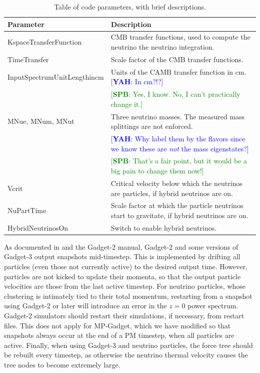 \documentclass[useAMS, usenatbib]{mnras}
\newcommand{\spb}[1]{{\textcolor{green}{[{\bf SPB}: #1]}}}
\newcommand{\yah}[1]{{\textcolor{blue}{[{\bf YAH}: #1]}}}
\begin{document}
\begin{table}
\begin{center}
\begin{tabular}{|l|l|}
\hline
    Parameter & Description \\
\hline
KspaceTransferFunction   & CMB transfer functions, used to compute the neutrino the neutrino integration. \\
TimeTransfer             & Scale factor of the CMB transfer functions. \\
InputSpectrumUnitLengthincm   & Units of the CAMB transfer function in cm. \yah{In cm?!?} \\
&\spb{Yes, I know. No, I can't practically change it.}\\
MNue, MNum, MNut &  Three neutrino masses. The measured mass splittings are not enforced. \\
&\yah{Why label them by the flavors since we know these are \emph{not} the mass eigenstates?} \\
&\spb{That's a fair point, but it would be a big pain to change them now!}\\
Vcrit            & Critical velocity below which the neutrinos are particles, if hybrid neutrinos are on. \\
NuPartTime       & Scale factor at which the particle neutrinos start to gravitate, if hybrid neutrinos are on. \\
HybridNeutrinosOn       & Switch to enable hybrid neutrinos. \\
\hline
\end{tabular}
\end{center}
\caption{Table of code parameters, with brief descriptions.}
\label{tab:parameters}
\end{table}

As documented in \cite{Springel_2005} and the Gadget-2 manual, Gadget-2 and some versions of Gadget-3 output snapshots mid-timestep. This is implemented by drifting all particles (even those not currently active) to the desired output time. However, particles are not kicked to update their momenta, so that the output particle velocities are those from the last active timestep. For neutrino particles, whose clustering is intimately tied to their total momentum, restarting from a snapshot using Gadget-2 or later will introduce an error in the $z=0$ power spectrum. Gadget-2 simulators should restart their simulations, if necessary, from restart files. This does not apply for MP-Gadget, which we have modified so that snapshots always occur at the end of a PM timestep, when all particles are active. Finally, when using Gadget-3 and neutrino particles, the force tree should be rebuilt every timestep, as otherwise the neutrino thermal velocity causes the tree nodes to become extremely large.
\end{document}
